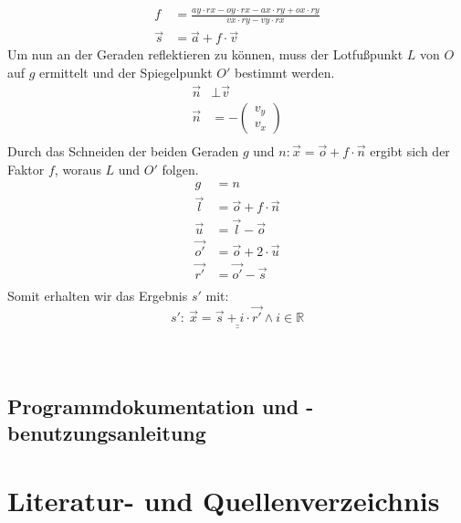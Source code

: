 \documentclass[reducespace,stylepage,semiarbeit]{spezidoc}
\newcommand{\vect}[2]{\begin{pmatrix}#1\\#2\end{pmatrix}}
\begin{document}
\begin{equation*}
\begin{split}
f &= \frac{ay \cdot rx - oy \cdot rx - ax \cdot ry + ox \cdot ry}{vx \cdot ry - vy \cdot rx} \\
\vec{s} &= \vec{a} + f \cdot \vec{v}
\end{split}
\end{equation*}
Um nun an der Geraden reflektieren zu können, muss der Lotfußpunkt $L$ von $O$ auf $g$ ermittelt und der Spiegelpunkt $O'$ bestimmt werden.
\begin{equation*}
\begin{split}
\vec{n} &\bot \vec{v} \\
\vec{n} &= -\vect{v_y}{v_x} \\
\end{split}
\end{equation*}
Durch das Schneiden der beiden Geraden $g$ und $n: \vec{x} = \vec{o} + f \cdot \vec{n}$ ergibt sich der Faktor $f$, woraus $L$ und $O'$ folgen.
\begin{equation*}
\begin{split}
g &= n \\
\vec{l} &= \vec{o} + f \cdot \vec{n} \\
\vec{u} &= \vec{l} - \vec{o} \\
\vec{o'} &= \vec{o} + 2 \cdot \vec{u} \\
\vec{r'} &= \vec{o'} - \vec{s} \\
\end{split}
\end{equation*}
Somit erhalten wir das Ergebnis $s'$ mit:
\begin{equation*}
\underline{\underline{s':~ \vec{x} = \vec{s} + i \cdot \vec{r'} \wedge i \in \mathds{R}}}
\end{equation*}






\begin{equation*}
\begin{split}
\end{split}
\end{equation*}

\begin{subequations}
\begin{align}
\end{align}
\end{subequations}


\subsection{Programmdokumentation und -benutzungsanleitung}

\newpage
\nocite{*}
\section{Literatur- und Quellenverzeichnis}
\printbibliography[type=book, title=Buchquellen]
\printbibliography[type=online, title=Internetquellen]


\eidesstattlicheerklaerung
\end{document}
